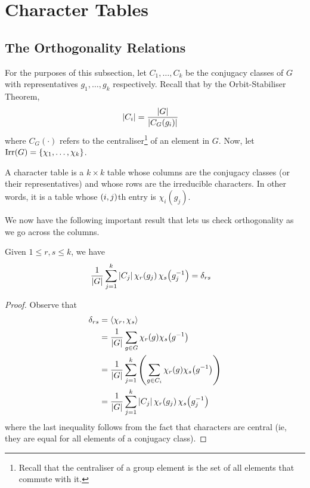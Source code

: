 \section{Character Tables}

\subsection{The Orthogonality Relations}

For the purposes of this subsection, let $C_1, \ldots, C_k$ be the conjugacy classes of $G$ with representatives $g_1, \ldots, g_k$ respectively. Recall that by the Orbit-Stabiliser Theorem,
\begin{align*}
    \left\lvert C_i \right\rvert &= \frac{\left\lvert G \right\rvert}{\left\lvert C_G(g_i) \right\rvert}
\end{align*}
where $C_G(\cdot)$ refers to the centraliser\footnote{Recall that the centraliser of a group element is the set of all elements that commute with it.} of an element in $G$. Now, let $\operatorname{Irr}\!\left( G \right) = \left\{ \chi_1, \ldots, \chi_k \right\}$.

\begin{boxdefinition}
    A character table is a $k \times k$ table whose columns are the conjugacy classes (or their representatives) and whose rows are the irreducible characters. In other words, it is a table whose $\left( i,j \right)$th entry is $\chi_i(g_j)$.
\end{boxdefinition}

We now have the following important result that lets us check orthogonality as we go across the columns.

\begin{boxproposition} \label{SP:1st_Orth_Rel}
    Given $1 \leq r, s \leq k$, we have
    \begin{align*}
        \frac{1}{\left\lvert G \right\rvert} \sum_{j=1}^{k} \left\lvert C_j \right\rvert \chi_r\!\left( g_j \right) \chi_s\!\left( g_j^{-1} \right) &= \delta_{rs}
    \end{align*}
\end{boxproposition}
\begin{proof}
    Observe that
    \begin{align*}
        \delta_{rs} &=
        \left\langle \chi_r, \chi_s \right\rangle \\
        &= \frac{1}{\left\lvert G \right\rvert} \sum_{g \in G} \chi_r(g) \chi_s\!\left( g^{-1} \right) \\
        &= \frac{1}{\left\lvert G \right\rvert} \sum_{j=1}^{k} \left( \sum_{g \in C_i} \chi_r(g) \chi_s\!\left( g^{-1} \right) \right) \\
        &= \frac{1}{\left\lvert G \right\rvert} \sum_{j=1}^{k} \left\lvert C_j \right\rvert \chi_r\!\left( g_j \right) \chi_s\!\left( g_j^{-1} \right)
    \end{align*}
    where the last inequality follows from the fact that characters are central (ie, they are equal for all elements of a conjugacy class).
\end{proof}

